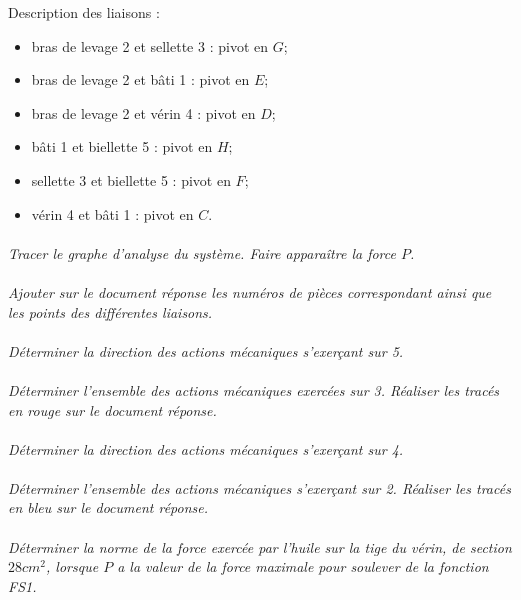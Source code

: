 \documentclass[11pt,oneside]{article}
\begin{document}
Description des liaisons : 
\begin{itemize}
\item bras de levage 2 et sellette 3 : pivot en $G$;
\item bras de levage 2 et bâti 1 : pivot en $E$;
\item bras de levage 2 et vérin 4 : pivot en $D$;
\item bâti 1 et biellette 5 : pivot en $H$;
\item sellette 3 et biellette 5 : pivot en $F$;
\item vérin 4 et bâti 1 : pivot en $C$.
\end{itemize}

\paragraph{}
\textit{Tracer le graphe d'analyse du système. Faire apparaître la force $P$.}

\paragraph{}
\textit{Ajouter sur le document réponse les numéros de pièces correspondant ainsi que les points des différentes liaisons.}

\paragraph{}
\textit{Déterminer la direction des actions mécaniques s'exerçant sur 5.}

\paragraph{}
\textit{Déterminer l'ensemble des actions mécaniques exercées sur 3. Réaliser les tracés en rouge sur le document réponse.}

\paragraph{}
\textit{Déterminer la direction des actions mécaniques s'exerçant sur 4.}

\paragraph{}
\textit{Déterminer l'ensemble des actions mécaniques s'exerçant sur 2. Réaliser les tracés en bleu sur le document réponse. }

\paragraph{}
\textit{Déterminer la norme de la force exercée par l'huile sur la tige du vérin, de section $28 cm^2$, lorsque $P$ a la valeur de la force maximale pour soulever de la fonction FS1.}
\end{document}
